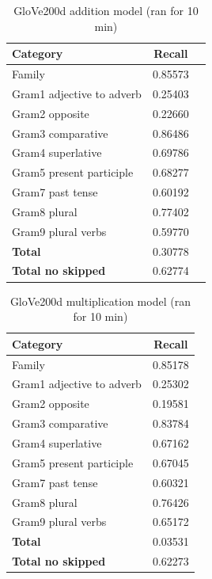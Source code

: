 \begin{table}[h!]
	\centering
\begin{tabular}{| l | c | r}
    	\hline
    	\textbf{Category} &    \textbf{Recall}\\ \hline
    	Family 						& 0.85573 \\
    	Gram1 adjective to adverb 	& 0.25403 \\
    	Gram2 opposite 				& 0.22660 \\
    	Gram3 comparative 			& 0.86486 \\
    	Gram4 superlative 			& 0.69786 \\
    	Gram5 present participle	& 0.68277 \\
    	Gram7 past tense 			& 0.60192 \\
    	Gram8 plural 				& 0.77402 \\
    	Gram9 plural verbs 			& 0.59770 \\
    	\textbf{Total}				& 0.30778 \\
    	\textbf{Total no skipped}	& 0.62774 \\ \hline
\end{tabular}
\caption{GloVe200d addition model (ran for 10 min)}
\label{table:glove200d_addition}
\end{table}

\begin{table}[h!]
	\centering
\begin{tabular}{| l | c |}
    	\hline
    	\textbf{Category} &    \textbf{Recall}\\ \hline
    	Family 						& 0.85178 \\
    	Gram1 adjective to adverb 	& 0.25302 \\
    	Gram2 opposite 				& 0.19581 \\
    	Gram3 comparative 			& 0.83784 \\
    	Gram4 superlative 			& 0.67162 \\
    	Gram5 present participle	& 0.67045 \\
    	Gram7 past tense 			& 0.60321 \\
    	Gram8 plural 				& 0.76426 \\
    	Gram9 plural verbs 			& 0.65172 \\
    	\textbf{Total}				& 0.03531 \\
    	\textbf{Total no skipped}	& 0.62273 \\ \hline
\end{tabular}
\caption{GloVe200d multiplication model (ran for 10 min)}
\label{table:glove200d_multiplication}
\end{table}

